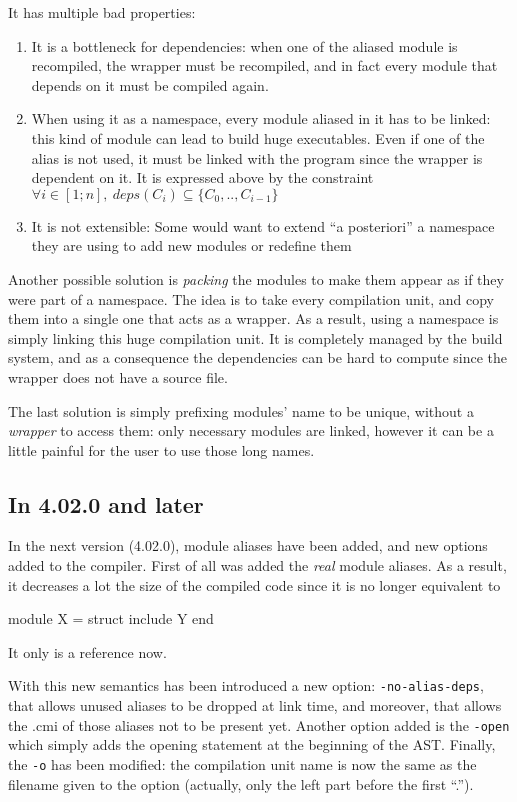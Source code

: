 \documentclass[11pt,a4paper]{article}
\begin{document}
It has multiple bad properties:
\begin{enumerate}
  \item It is a bottleneck for dependencies: when one of the aliased module is
    recompiled, the wrapper must be recompiled, and in fact every module that
    depends on it must be compiled again.
  \item When using it as a namespace, every module aliased in it has to be
    linked: this kind of module can lead to build huge executables. Even if one
    of the alias is not used, it must be linked with the program since the
    wrapper is dependent on it. It is expressed above by the constraint
    $ \forall i \in [1; n], ~deps(C_i) \subseteq \{ C_0, .., C_{i-1} \}$
  \item It is not extensible: Some would want to extend ``a posteriori'' a
    namespace they are using to add new modules or redefine them
\end{enumerate}

Another possible solution is \emph{packing} the modules to make them appear as
if they were part of a namespace. The idea is to take every compilation unit,
and copy them into a single one that acts as a wrapper. As a result, using a
namespace is simply linking this huge compilation unit. It is completely managed
by the build system, and as a consequence the dependencies can be hard to
compute since the wrapper does not have a source file.

The last solution is simply prefixing modules' name to be unique, without a
\emph{wrapper} to access them: only necessary modules are linked, however it can
be a little painful for the user to use those long names.

\subsection{In 4.02.0 and later}

In the next version (4.02.0), module aliases have been added, and new options
added to the compiler. First of all was added the \emph{real} module aliases. As
a result, it decreases a lot the size of the compiled code since it is no longer
equivalent to 
\begin{OCaml}
  module X = struct include Y end
\end{OCaml} 
It only is a reference now.

With this new semantics has been introduced a new option:
\texttt{-no-alias-deps}, that allows unused aliases to be dropped at link time,
and moreover, that allows the .cmi of those aliases not to be present
yet. Another option added is the \texttt{-open} which simply adds the opening
statement at the beginning of the AST. Finally, the \texttt{-o} has been
modified: the compilation unit name is now the same as the filename given to the
option (actually, only the left part before the first ``.'').
\end{document}
